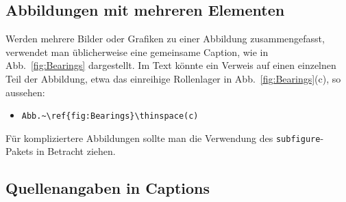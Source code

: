 \begin{comment}
\subsubsection{EPS-Grafiken über PDF generieren}

Falls man Grafiken aus einer Applikation übernehmen möchte, die
keine Möglichkeit zum EPS-Export anbietet (\zB\ {\em
PowerPoint}) oder unbrauchbare EPS-Dateien erzeugt, kann man
auch den Umweg
über eine PDF-Datei nehmen: 
%
\begin{itemize}
\item Dazu erzeugt man zunächst mit Adobe \emph{Distiller} (als
virtueller Drucker) eine PDF-Datei. %
\item Dann öffnet man die PDF-Datei mit \emph{Acrobat}, schneidet
diese (mit dem \emph{Crop Tool}) auf das richtige Format und %
\item speichert schließlich die Datei (mit \emph{Save As}) im
\texttt{eps}-Format, natürlich wiederum \emph{ohne} Preview
(in \emph{Settings} einstellbar). %
\end{itemize}
Das ist zwar etwas mühsamer als auf dem direkten Weg, aber im
Notfall meist einfacher als ein Grafik ganz neu zu machen. 
Eventuelle Probleme bei \texttt{psfrag}-Ersetzungen (siehe Abschn.\ \ref{sec:tex-schriften-in-grafiken}) sind dabei 
allerdings nicht auszuschließen.

\end{comment}


\subsection{Abbildungen mit mehreren Elementen}

Werden mehrere Bilder oder Grafiken zu einer Abbildung zusammengefasst, 
verwendet man üblicherweise eine gemeinsame Caption, wie in Abb.~\ref{fig:Bearings}
dargestellt. Im Text könnte ein Verweis auf einen einzelnen Teil der Abbildung, etwa das 
einreihige Rollenlager in Abb.~\ref{fig:Bearings}\thinspace(c), so aussehen:
%
\begin{itemize}
\item[] \verb!Abb.~\ref{fig:Bearings}\thinspace(c)! 
\end{itemize}
%
Für kompliziertere Abbildungen sollte man die Verwendung des 
\texttt{subfigure}-Pakets \cite{Cochran95} in Betracht ziehen.


\subsection{Quellenangaben in Captions}
\label{sec:QuellenangabenInCaptions}

